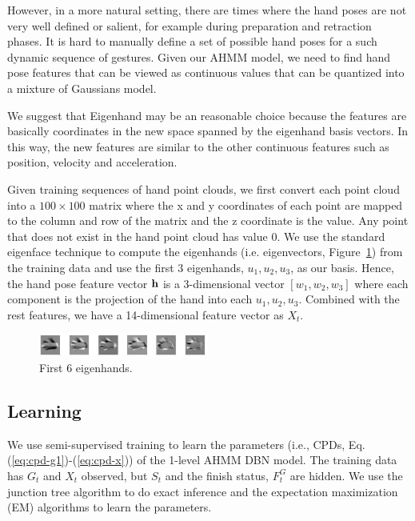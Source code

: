 \documentclass[10pt,twocolumn,letterpaper]{article}
\begin{document}
However, in a more natural setting, there are times where the hand poses are not 
very well defined or salient, for example during preparation and retraction phases.
It is hard to manually define a set of possible hand poses for a such dynamic sequence
of gestures. Given our AHMM model, we need to find hand pose features that can be
viewed as continuous values that can be quantized into a mixture of Gaussians model.

We suggest that Eigenhand may be an reasonable choice because the features are basically 
coordinates in the new space spanned by the eigenhand basis vectors. In this way, the
new features are similar to the other continuous features such as position, velocity
and acceleration.  
 
Given training sequences of hand point clouds, we first convert each point cloud
into a $100 \times 100$ matrix where the x and y coordinates of each point are mapped to the column and 
row of the matrix and the z coordinate is the value. Any point that does not exist in
the hand point cloud has value 0. We use the standard eigenface technique to compute
the eigenhands (i.e. eigenvectors, Figure~\ref{fig:eigen-hand}) from the training data and use the first 3 eigenhands,
$u_1, u_2, u_3$, as our basis. Hence, the hand pose feature vector $\bf{h}$ is a 3-dimensional vector
$[w_1, w_2, w_3]$ where each component is the projection of the hand into each $u_1, u_2, u_3$.
Combined with the rest features, we have a 14-dimensional feature vector
as $X_t$.

\begin{figure}[h]
  \centering
  \includegraphics[width=0.5\textwidth]{figure/eigen-hand.png} 
  \caption{First 6 eigenhands.}
  \label{fig:eigen-hand}
\end{figure}

\subsection{Learning}
We use semi-supervised training to learn the parameters (i.e., CPDs, Eq. (\ref{eq:cpd-g1})-(\ref{eq:cpd-x})) of the 1-level AHMM DBN model.
The training data has $G_t$ and $X_t$ observed, but $S_t$ and the finish status, $F_t^G$ are hidden.
We use the junction tree algorithm to do exact inference and the expectation maximization (EM)
algorithms to learn the parameters. 
\end{document}
